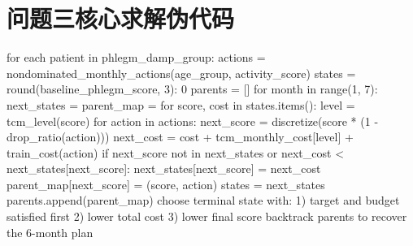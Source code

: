 \documentclass{MathorCupmodeling}
\begin{document}
	\section{问题三核心求解伪代码}
	\begin{python}
	for each patient in phlegm_damp_group:
	    actions = nondominated_monthly_actions(age_group, activity_score)
	    states = {round(baseline_phlegm_score, 3): 0}
	    parents = []
	    for month in range(1, 7):
	        next_states = {}
	        parent_map = {}
	        for score, cost in states.items():
	            level = tcm_level(score)
	            for action in actions:
	                next_score = discretize(score * (1 - drop_ratio(action)))
	                next_cost = cost + tcm_monthly_cost[level] + train_cost(action)
	                if next_score not in next_states or next_cost < next_states[next_score]:
	                    next_states[next_score] = next_cost
	                    parent_map[next_score] = (score, action)
	        states = next_states
	        parents.append(parent_map)
	    choose terminal state with:
	        1) target and budget satisfied first
	        2) lower total cost
	        3) lower final score
	    backtrack parents to recover the 6-month plan
		\end{python}
\end{document}
